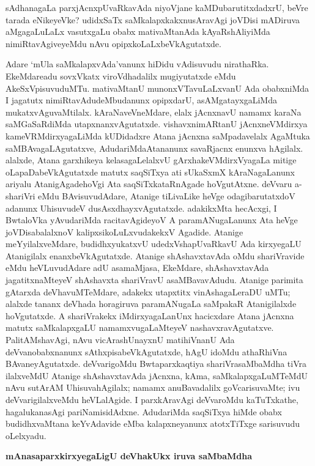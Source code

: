 sAdhanagaLa parxjAcnxpUvaRkavAda niyoVjane kaMDubarutitxdadxrU, beVre tarada eNikeyeVke? udidxSaTx saMkalapxkakxnusAravAgi joVDisi mADiruva aMgagaLuLaLx vasutxgaLu obabx mativaMtanAda kAyaRshAliyiMda nimiRtavAgiveyeMdu nAvu opipxkoLaLxbeVkAgutatxde.

Adare `mUla saMkalapxvAda'vanunx hiDidu vAdisuvudu nirathaRka. EkeMdare\break adu sovxVkatx viroVdhadalilx mugiyutatxde eMdu AkeSxVpisuvuduMTu. mativaMtanU munonxVTavuLaLxvanU Ada obabxniMda I jagatutx nimiRtavAdudeMbudanunx opipxdarU, asAMgatayxgaLiMda mukatxvAguvaMtilalx. kAraNaveVneMdare, elalx jAcnxnavU namamx karaNa saMGaSaRdiMda utapxnanxvAgutatxde. vishavxnimARtanU jAcnxneVMdirxya kameVRMdirxya\break\-gaLiMda kUDidadxre Atana jAcnxna saMpadavelalx AgaMtuka saMBAvagaLAgutatxve, AdudariMda\break Atananunx savaRjacnx enunxva hAgilalx. alalxde, Atana garxhikeya kelasagaLelalxvU gArxha\break\-keVMdirxVyagaLa mitige oLapaDabeVkAgutatxde matutx saqSiTxya ati sUkaSxmX kAraNagaLanunx ariyalu AtanigAgadehoVgi Ata saqSiTxkataRnAgade hoVgutAtxne. deVvaru a-shariVri eMdu BAvisuvudAdare, Atanige tiLivaLike heVge odagibarutatxdoV adanunx Uhisu\-vudeV dusAsxdhayxvAgutatxde. adakikxMta hecAcxgi, I BwtaloVka yAvudariMda racita\-vAgideyoV A paramANugaLanunx Ata heVge joVDisabalalxnoV kalipxsikoLuLxvudakekxV Agadide. Atanige meYyilalxveMdare, budidhxyukatxvU udedxVshapUvaRkavU Ada kirxye\-gaLU Atani\-gilalx enanxbeVkAgutatxde. Atanige shAshavxtavAda oMdu shariVravide eMdu heVLuvudAdare adU asamaMjasa, EkeMdare, shAshavxtavAda jagatitxnaMteyeV shAshavxta shariVravU asaMBavavAdudu. Atanige parimita gAtarxda deVhavuMTeMdare, adakekx utapxtitx vinAsha\-gaLeraDU uMTu; alalxde tananx deVhada horagiruva paramANugaLa saMpakaR Ata\-nigilalxde hoVgutatxde. A shariVrakekx iMdirxyagaLanUnx hacicxdare Atana jAcnxna matutx saMkalapx\-gaLU namamxvugaLaMteyeV nashavxravAgutatxve. PalitAMshavAgi, nAvu vicArashUnayxnU matihiVnanU Ada deVvanobabxnanunx sAthxpisabeVkAgutatxde, hAgU idoMdu athaRhiVna BAvaneyAgutatxde. deVvarigoMdu Bwtaparxkaqtiya shariVrasaMbaMdha tiVra ilalxveMdU Atanige shAshavxtavAda jAcnxna, kAma, saMkalapxgaLuMTeMdU nAvu sutArAM UhisuvahAgilalx; namamx anuBavadalilx goVcarisuvaMte; ivu deVvarigilalxveMdu heVLalAgide. I parxkAravAgi deVvaroMdu kaTuTxkathe, hagalukanasAgi pariNamisidAdxne. AdudariMda saqSiTxya hiMde obabx budidhxvaMtana keYvAdavide eMba kalapxneyanunx atotxTiTxge sarisuvudu oLelxyadu.

\bigskip
\begin{center}
{\Large\bf mAnasaparxkirxyegaLigU deVhakUkx iruva saMbaMdha}
\end{center}

